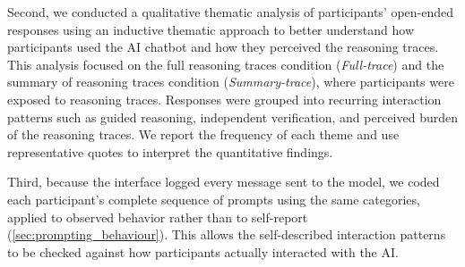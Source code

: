 \documentclass[manuscript,review,anonymous]{acmart}
\begin{document}
Second, we conducted a qualitative thematic analysis of participants’ open-ended responses using an inductive thematic approach \cite{clarke2017thematic} to better understand how participants used the AI chatbot and how they perceived the reasoning traces. This analysis focused on the full reasoning traces condition (\textit{Full-trace}) and the summary of reasoning traces condition (\textit{Summary-trace}), where participants were exposed to reasoning traces. Responses were grouped into recurring interaction patterns such as guided reasoning, independent verification, and perceived burden of the reasoning traces. We report the frequency of each theme and use representative quotes to interpret the quantitative findings.

Third, because the interface logged every message sent to the model, we coded each participant's complete sequence of prompts using the same categories, applied to observed behavior rather than to self-report (\autoref{sec:prompting_behaviour}). This allows the self-described interaction patterns to be checked against how participants actually interacted with the AI.

\end{document}
